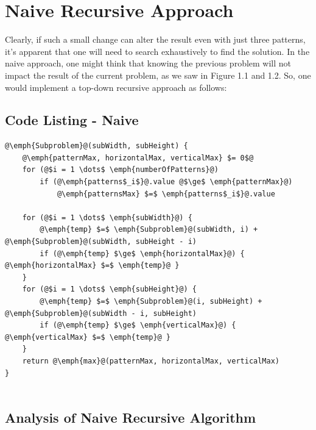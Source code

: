 \documentclass[paper=a4, fontsize=11pt]{scrartcl} %
\numberwithin{equation}{section} %
\numberwithin{figure}{section} %
\numberwithin{table}{section} %
\begin{document}
%
%
%
\section{Naive Recursive Approach}
Clearly, if such a small change can alter the result even with just three patterns, it's apparent  that one will need to search exhaustively to find the solution. In the naive approach, one might think that knowing the previous problem will not impact the result of the current problem, as we saw in Figure 1.1 and 1.2. So, one would implement a top-down recursive approach as follows: \\

\subsection{Code Listing - Naive}
\lstset{escapechar=\@}
\lstset{tabsize=2}
 \begin{lstlisting}
@\emph{Subproblem}@(subWidth, subHeight) {
	@\emph{patternMax, horizontalMax, verticalMax} $= 0$@ 
	for (@$i = 1 \dots$ \emph{numberOfPatterns}@)
		if (@\emph{patterns$_i$}@.value @$\ge$ \emph{patternMax}@)
			@\emph{patternsMax} $=$ \emph{patterns$_i$}@.value
			
	for (@$i = 1 \dots$ \emph{subWidth}@) {
		@\emph{temp} $=$ \emph{Subproblem}@(subWidth, i) + @\emph{Subproblem}@(subWidth, subHeight - i)
		if (@\emph{temp} $\ge$ \emph{horizontalMax}@) {	@\emph{horizontalMax} $=$ \emph{temp}@ }
	}
	for (@$i = 1 \dots$ \emph{subHeight}@) {
		@\emph{temp} $=$ \emph{Subproblem}@(i, subHeight) + @\emph{Subproblem}@(subWidth - i, subHeight)
		if (@\emph{temp} $\ge$ \emph{verticalMax}@) { @\emph{verticalMax} $=$ \emph{temp}@ }
	}
	return @\emph{max}@(patternMax, horizontalMax, verticalMax)
}
	
\end{lstlisting}   
\subsection{Analysis of Naive Recursive Algorithm}
\end{document}
